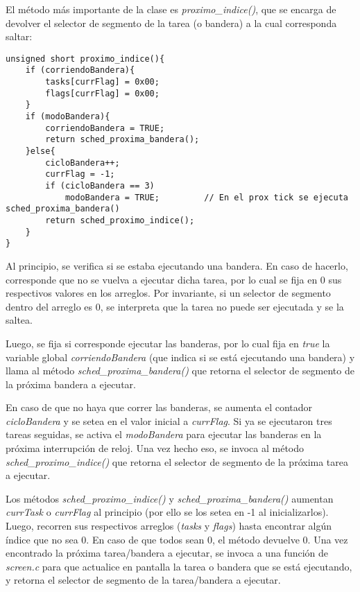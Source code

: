 \documentclass[a4paper]{article}
\newenvironment{codesnippet}{%
	\begin{Sbox}\begin{minipage}{\textwidth}\sffamily\small}%
	{\end{minipage}\end{Sbox}%
		\begin{center}%
		\vspace{-0.4cm}\colorbox{litegrey}{\TheSbox}\end{center}\vspace{0.3cm}}
\begin{document}
El método más importante de la clase es \textit{proximo_indice()}, que se encarga de devolver el selector de segmento de la tarea (o bandera) a la cual corresponda saltar:
\begin{codesnippet}
\begin{verbatim}
unsigned short proximo_indice(){
    if (corriendoBandera){
        tasks[currFlag] = 0x00;
        flags[currFlag] = 0x00;
    }
    if (modoBandera){
        corriendoBandera = TRUE;
        return sched_proxima_bandera();
    }else{
        cicloBandera++; 
        currFlag = -1;					
        if (cicloBandera == 3)
            modoBandera = TRUE;			// En el prox tick se ejecuta sched_proxima_bandera()
        return sched_proximo_indice();
    }
}
\end{verbatim}
\end{codesnippet}

Al principio, se verifica si se estaba ejecutando una bandera. En caso de hacerlo, corresponde que no se vuelva a ejecutar dicha tarea, por lo cual se fija en 0 sus respectivos valores en los arreglos. Por invariante, si un selector de segmento dentro del arreglo es 0, se interpreta que la tarea no puede ser ejecutada y se la saltea.

Luego, se fija si corresponde ejecutar las banderas, por lo cual fija en \textit{true} la variable global \textit{corriendoBandera} (que indica si se está ejecutando una bandera) y llama al método \textit{sched_proxima_bandera()} que retorna el selector de segmento de la próxima bandera a ejecutar.

En caso de que no haya que correr las banderas, se aumenta el contador \textit{cicloBandera} y se setea en el valor inicial a \textit{currFlag}. Si ya se ejecutaron tres tareas seguidas, se activa el \textit{modoBandera} para ejecutar las banderas en la próxima interrupción de reloj. Una vez hecho eso, se invoca al método \textit{sched_proximo_indice()} que retorna el selector de segmento de la próxima tarea a ejecutar.


Los métodos \textit{sched_proximo_indice()} y \textit{sched_proxima_bandera()} aumentan \textit{currTask} o \textit{currFlag} al principio (por ello se los setea en -1 al inicializarlos). Luego, recorren sus respectivos arreglos (\textit{tasks} y \textit{flags}) hasta encontrar algún índice que no sea 0. En caso de que todos sean 0, el método devuelve 0. Una vez encontrado la próxima tarea/bandera a ejecutar, se invoca a una función de \textit{screen.c} para que actualice en pantalla la tarea o bandera que se está ejecutando, y retorna el selector de segmento de la tarea/bandera a ejecutar.
\end{document}
